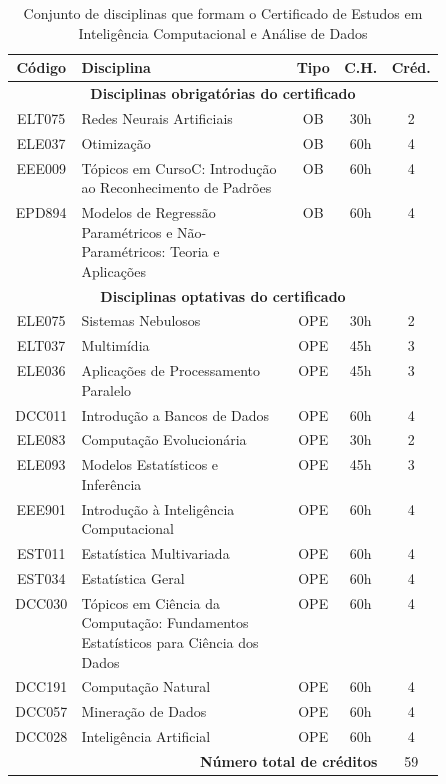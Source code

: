 \documentclass{article}
\newcommand{\curso}{Curso} %
\begin{document}
	\begin{table}[H]
		\centering
		\begin{tabular}{|c|p{0.5\linewidth}|c|c|c|}\hline
			\textbf{Código} & \textbf{Disciplina} & \textbf{Tipo} & \textbf{C.H.} & \textbf{Créd.} \\ \hline
			\multicolumn{5}{|c|}{\textbf{Disciplinas obrigatórias do certificado}} \\ \hline
			ELT075 & Redes Neurais Artificiais & OB & 30h & 2 \\ \hline
			ELE037 & Otimização & OB & 60h & 4 \\ \hline
			EEE009 & Tópicos em \curso C: Introdução ao Reconhecimento de Padrões & OB & 60h & 4 \\ \hline
			EPD894 & Modelos de Regressão Paramétricos e Não-Paramétricos: Teoria e Aplicações & OB & 60h & 4 \\ \hline
			\multicolumn{5}{|c|}{\textbf{Disciplinas optativas do certificado}} \\ \hline
			ELE075 & Sistemas Nebulosos & OPE & 30h & 2 \\ \hline
			ELT037 & Multimídia & OPE & 45h & 3 \\ \hline
			ELE036 & Aplicações de Processamento Paralelo & OPE & 45h & 3 \\ \hline
			DCC011 & Introdução a Bancos de Dados & OPE & 60h & 4 \\ \hline
			ELE083 & Computação Evolucionária & OPE & 30h & 2 \\ \hline
			ELE093 & Modelos Estatísticos e Inferência & OPE & 45h & 3 \\ \hline
			EEE901 & Introdução à Inteligência Computacional & OPE & 60h & 4 \\ \hline
			EST011 & Estatística Multivariada & OPE & 60h & 4 \\ \hline
			EST034 & Estatística Geral & OPE & 60h & 4 \\ \hline
			DCC030 & Tópicos em Ciência da Computação: Fundamentos Estatísticos para Ciência dos Dados & OPE & 60h & 4 \\ \hline
			DCC191 & Computação Natural & OPE & 60h & 4 \\ \hline
			DCC057 & Mineração de Dados & OPE & 60h & 4 \\ \hline
			DCC028 & Inteligência Artificial & OPE & 60h & 4 \\ \hline
			\multicolumn{4}{|r|}{\textbf{Número total de créditos}} & 59 \\ \hline
			
		\end{tabular}
		\caption{Conjunto de disciplinas que formam o Certificado de Estudos em Inteligência Computacional e Análise de Dados}
		\label{tab:Disc}
	\end{table}
	
\end{document}
